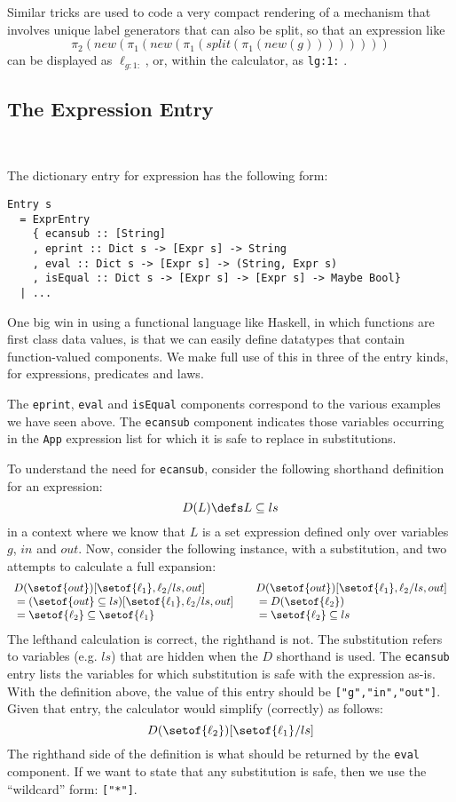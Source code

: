 Similar tricks are used to code a very compact rendering
of a mechanism that involves unique label generators
that can also be split, so that an expression like
\[
 \pi_2(new(\pi_1(new(\pi_1(split(\pi_1(new(g))))))))
\]
can be displayed as $\ell_{g:1:}$, or,
within the calculator, as \texttt{lg:1:} .


\subsection{The Expression Entry}~

The dictionary entry for expression has the following form:
\begin{verbatim}
Entry s
  = ExprEntry
    { ecansub :: [String]
    , eprint :: Dict s -> [Expr s] -> String
    , eval :: Dict s -> [Expr s] -> (String, Expr s)
    , isEqual :: Dict s -> [Expr s] -> [Expr s] -> Maybe Bool}
  | ...
\end{verbatim}
One big win in using a functional language like Haskell,
in which functions are first class data values,
is that we can easily define datatypes that
contain function-valued components.
We make full use of this in three of the entry kinds,
for expressions, predicates and laws.

The \texttt{eprint}, \texttt{eval} and \texttt{isEqual} components correspond
to the various examples we have seen above.
The \texttt{ecansub} component
indicates those variables occurring in the \texttt{App} expression 
list for which it is safe to replace in substitutions.

To understand the need for \texttt{ecansub},
consider the following shorthand definition for an expression:
\[
  D(L) \defs L \subseteq ls
\]
in a context where we know that $L$ is a set expression defined
only over variables $g$, $in$ and $out$.
Now, consider the following instance, with a substitution,
and two attempts to calculate a full expansion:
\[\begin{array}{l@{\qquad}l}
   D(\setof{out})[\setof{\ell_1},\ell_2/ls,out]
 & D(\setof{out})[\setof{\ell_1},\ell_2/ls,out]
\\ {} = (\setof{out} \subseteq ls)[\setof{\ell_1},\ell_2/ls,out]
 & {}= D(\setof{\ell_2})
\\ {} = \setof{\ell_2} \subseteq \setof{\ell_1}
 & {} = \setof{\ell_2} \subseteq ls
\end{array}\]
The lefthand calculation is correct, the righthand is not.
The substitution refers to variables (e.g. $ls$)
that are hidden when the $D$ shorthand is used.
The \texttt{ecansub} entry lists the variables for which substitution
is safe with the expression as-is.
With the definition above, the value of this entry
 should be \texttt{["g","in","out"]}.
Given that entry, the calculator would simplify (correctly) as follows:
\[
  D(\setof{\ell_2})[\setof{\ell_1}/ls]
\]
The righthand side of the definition is what should be returned
by the \texttt{eval} component.
If we want to state that any substitution is safe,
then we use the ``wildcard'' form: \texttt{["*"]}.

